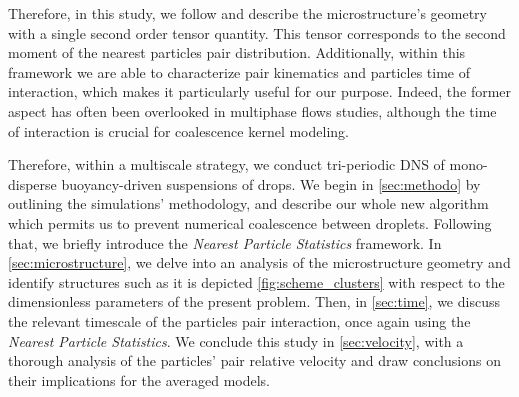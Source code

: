 Therefore, in this study, we follow \citet{zhang2023evolution} and describe the microstructure's geometry with a single second order tensor quantity. 
This tensor corresponds to the second moment of the nearest particles pair distribution.  
Additionally, within this framework we are able to characterize pair kinematics and particles time of interaction, which makes it particularly useful for our purpose. 
Indeed, the former aspect has often been overlooked in multiphase flows studies, although the time of interaction is crucial for coalescence kernel modeling.

Therefore, within a multiscale strategy, we conduct tri-periodic DNS of mono-disperse buoyancy-driven suspensions of drops. 
We begin in \ref{sec:methodo} by outlining the simulations' methodology, and describe our whole new algorithm which permits us to prevent numerical coalescence between droplets. 
Following that, we briefly introduce the \textit{Nearest Particle Statistics} framework. 
In \ref{sec:microstructure}, we delve into an analysis of the microstructure geometry and identify structures such as it is depicted \ref{fig:scheme_clusters} with respect to the dimensionless parameters of the present problem. 
Then, in \ref{sec:time}, we discuss the relevant timescale of the particles pair interaction, once again using the \textit{Nearest Particle Statistics}. 
We conclude this study in \ref{sec:velocity}, with a thorough analysis of the particles' pair relative velocity and draw conclusions on their implications for the averaged models.

